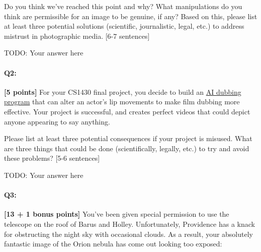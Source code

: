 \begin{tcolorbox}[colback=orange!5!white,colframe=orange!75!black]

Do you think we've reached this point and why? What manipulations do you think are permissible for an image to be genuine, if any? Based on this, please list at least three potential solutions (scientific, journalistic, legal, etc.) to address mistrust in photographic media. [6-7 sentences]
\end{tcolorbox}

\begin{tcolorbox}[colback=white!5!white,colframe=green!75!black]
\begin{mdframed}
    TODO: Your answer here
\end{mdframed}
\end{tcolorbox}


\pagebreak
\paragraph{Q2:} \textbf{[5 points]} For your CS1430 final project, you decide to build an \href{https://respeecher.medium.com/what-is-synthetic-film-dubbing-ai-deepfake-technology-explained-9f6118532e8c}{AI dubbing program} that can alter an actor's lip movements to make film dubbing more effective. Your project is successful, and creates perfect videos that could depict anyone appearing to say anything.

\begin{tcolorbox}[colback=orange!5!white,colframe=orange!75!black]
Please list at least three potential consequences if your project is misused. What are three things that could be done (scientifically, legally, etc.) to try and avoid these problems? [5-6 sentences]
\end{tcolorbox}

\begin{tcolorbox}[colback=white!5!white,colframe=green!75!black]
\begin{mdframed}
        TODO: Your answer here
    \end{mdframed}
\end{tcolorbox}

\pagebreak


\paragraph{Q3:} \textbf{[13 + 1 bonus points]} You've been given special permission to use the telescope on the roof of Barus and Holley. Unfortunately, Providence has a knack for obstructing the night sky with occasional clouds. As a result, your absolutely fantastic image of the Orion nebula has come out looking too exposed:

